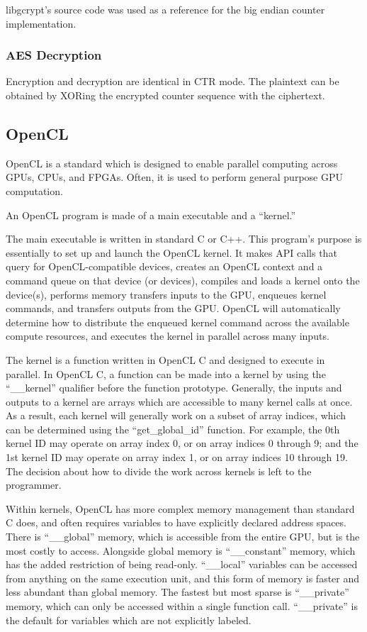 \documentclass[a4paper,10pt]{article}
\begin{document}
libgcrypt's source code was used as a reference for the big endian counter implementation\cite{libgcrypt}.

\subsubsection{AES Decryption}

Encryption and decryption are identical in CTR mode.  The plaintext can be obtained by XORing the encrypted counter sequence with the ciphertext.

\subsection{OpenCL}

OpenCL is a standard\cite{khronos} which is designed to enable parallel computing across GPUs, CPUs, and FPGAs.  Often, it is used to perform general purpose GPU computation.

An OpenCL program is made of a main executable and a ``kernel.''

The main executable is written in standard C or C++. This program's purpose is essentially to set up and launch the OpenCL kernel.  It makes API calls that query for OpenCL-compatible devices, creates an OpenCL context and a command queue on that device (or devices), compiles and loads a kernel onto the device(s), performs memory transfers inputs to the GPU, enqueues kernel commands, and transfers outputs from the GPU.  OpenCL will automatically determine how to distribute the enqueued kernel command across the available compute resources, and executes the kernel in parallel across many inputs.  

The kernel is a function written in OpenCL C and designed to execute in parallel.  In OpenCL C, a function can be made into a kernel by using the ``\_\_kernel'' qualifier before the function prototype.  Generally, the inputs and outputs to a kernel are arrays which are accessible to many kernel calls at once.  As a result, each kernel will generally work on a subset of array indices, which can be determined using the ``get\_global\_id'' function. For example, the 0th kernel ID may operate on array index 0, or on array indices 0 through 9; and the 1st kernel ID may operate on array index 1, or on array indices 10 through 19.  The decision about how to divide the work across kernels is left to the programmer.

Within kernels, OpenCL has more complex memory management than standard C does, and often requires variables to have explicitly declared address spaces.  There is ``\_\_global'' memory, which is accessible from the entire GPU, but is the most costly to access.  Alongside global memory is ``\_\_constant'' memory, which has the added restriction of being read-only.  ``\_\_local'' variables can be accessed from anything on the same execution unit, and this form of memory is faster and less abundant than global memory. The fastest but most sparse is ``\_\_private'' memory, which can only be accessed within a single function call.  ``\_\_private'' is the default for variables which are not explicitly labeled.
\end{document}
